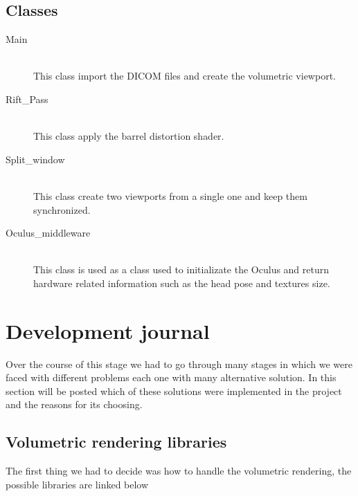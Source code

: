 \documentclass[11pt]{article} %
\begin{document}
\subsection{Classes}
\begin{description}

\item[Main] \hfill \\
  This class import the DICOM files and create the volumetric viewport.
   \item[Rift\_Pass] \hfill \\
  This class apply the barrel distortion shader.
  \item[Split\_window] \hfill \\
  This class create two viewports from a single one and keep them synchronized.
  \item[Oculus\_middleware] \hfill \\
  This class is used as a class used to initializate the Oculus and return hardware related information such as the head pose and textures size.

\end{description}



\newpage

\section{Development journal}
Over the course of this stage we had to go through many stages in which we were faced with different problems each one with many alternative solution. In this section will be posted which of these solutions were implemented in the project and the reasons for its choosing. 

\subsection{Volumetric rendering libraries}
The first thing we had to decide was how to handle the volumetric rendering, the possible libraries are linked below
\end{document}
